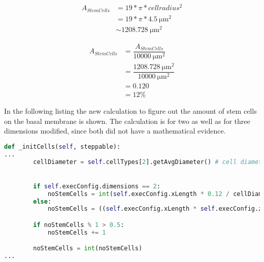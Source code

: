 \begin{equation}
\begin{split}
A_{StemCells} & = 19 * \pi *  cell radius^{2} \\
					& = 19 * \pi *  \SI{4.5}{\micro\metre^{2}}  \\
					& \sim \SI{1208.728}{\micro\metre^{2}}
\end{split}
\end{equation}

\begin{equation}
\begin{split}
A_{StemCells} & = \dfrac{A_{StemCells}}{\SI{10000}{\micro\metre^{2}}} \\
				& = \dfrac{\SI{1208.728}{\micro\metre^{2}}}{\SI{10000}{\micro\metre^{2}}} \\
				& = 0.120 \\
				& = 12\%
\end{split}
\end{equation}

In the following listing the new calculation to figure out the amount of stem cells on the basal membrane is shown. The calculation is for two as well as for three dimensions modified, since both did not have a mathematical evidence.

\begin{lstlisting}[language=Python, caption= new calculation of the amount of stem cells on the basal membrane with a mathematical evidence]
    def _initCells(self, steppable):
...
        cellDiameter = self.cellTypes[2].getAvgDiameter() # cell diameter is of type float


        if self.execConfig.dimensions == 2:
            noStemCells = int(self.execConfig.xLength * 0.12 / cellDiameter)
        else:
            noStemCells = ((self.execConfig.xLength * self.execConfig.zLength) * 0.12) / (PI * (cellDiameter / 2.) ** 2)

        if noStemCells % 1 > 0.5:
            noStemCells += 1

        noStemCells = int(noStemCells)
...
\end{lstlisting}

